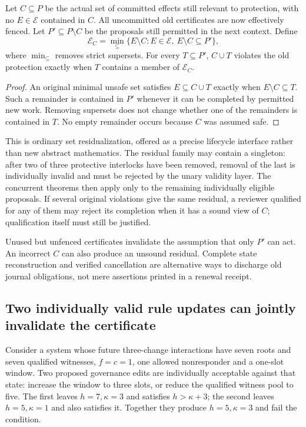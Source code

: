 \documentclass[11pt,a4paper]{article}
\theoremstyle{definition}\newtheorem{definition}{Definition}
\newcommand{\idtag}[1]{\textnormal{\textsf{[#1]}}}
\newcommand{\E}{\mathcal E}\newcommand{\B}{\mathcal B}\newcommand{\F}{\mathcal F}\newcommand{\Q}{\mathcal Q}
\begin{document}
\begin{proposition}[Exact residual-conflict handoff \idtag{JPA-T4}]
\label{prop:residual}
Let $C\subseteq P$ be the actual set of committed effects still relevant to protection, with no $E\in\E$ contained in $C$. All uncommitted old certificates are now effectively fenced. Let $P'\subseteq P\setminus C$ be the proposals still permitted in the next context. Define
\begin{equation}
\E_C=\min_{\subseteq}\{E\setminus C:E\in\E,\ E\setminus C\subseteq P'\},
\label{eq:residual}
\end{equation}
where $\min_{\subseteq}$ removes strict supersets. For every $T\subseteq P'$, $C\cup T$ violates the old protection exactly when $T$ contains a member of $\E_C$.
\end{proposition}
\begin{proof}
An original minimal unsafe set satisfies $E\subseteq C\cup T$ exactly when $E\setminus C\subseteq T$. Such a remainder is contained in $P'$ whenever it can be completed by permitted new work. Removing supersets does not change whether one of the remainders is contained in $T$. No empty remainder occurs because $C$ was assumed safe.
\end{proof}
This is ordinary set residualization, offered as a precise lifecycle interface rather than new abstract mathematics. The residual family may contain a singleton: after two of three protective interlocks have been removed, removal of the last is individually invalid and must be rejected by the unary validity layer. The concurrent theorems then apply only to the remaining individually eligible proposals. If several original violations give the same residual, a reviewer qualified for any of them may reject its completion when it has a sound view of $C$; qualification itself must still be justified.

Unused but unfenced certificates invalidate the assumption that only $P'$ can act. An incorrect $C$ can also produce an unsound residual. Complete state reconstruction and verified cancellation are alternative ways to discharge old journal obligations, not mere assertions printed in a renewal receipt.

\subsection{Two individually valid rule updates can jointly invalidate the certificate}
Consider a system whose future three-change interactions have seven roots and seven qualified witnesses, $f=c=1$, one allowed nonresponder and a one-slot window. Two proposed governance edits are individually acceptable against that state: increase the window to three slots, or reduce the qualified witness pool to five. The first leaves $h=7,\kappa=3$ and satisfies $h>\kappa+3$; the second leaves $h=5,\kappa=1$ and also satisfies it. Together they produce $h=5,\kappa=3$ and fail the condition.
\end{document}
